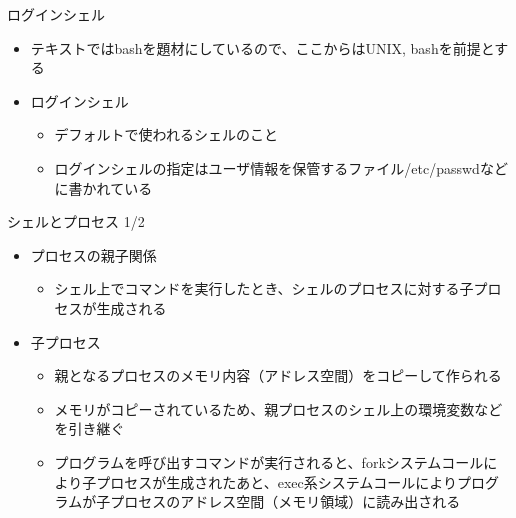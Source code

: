 \documentclass[12pt,aspectratio=169]{beamer}
\begin{document}
\begin{frame}{ログインシェル}
  \begin{itemize}
    \item テキストではbashを題材にしているので、ここからはUNIX, bashを前提とする

    \item ログインシェル
      \begin{itemize}
        \item デフォルトで使われるシェルのこと
        \item ログインシェルの指定はユーザ情報を保管するファイル/etc/passwdなどに書かれている
      \end{itemize}

  \end{itemize}

\end{frame}
\begin{frame}{シェルとプロセス 1/2}
  \begin{itemize}
    \item プロセスの親子関係
      \begin{itemize}
        \item シェル上でコマンドを実行したとき、シェルのプロセスに対する子プロセスが生成される
      \end{itemize}
    \item 子プロセス
      \begin{itemize}
        \item 親となるプロセスのメモリ内容（アドレス空間）をコピーして作られる
        \item メモリがコピーされているため、親プロセスのシェル上の環境変数などを引き継ぐ
        \item プログラムを呼び出すコマンドが実行されると、forkシステムコールにより子プロセスが生成されたあと、exec系システムコールによりプログラムが子プロセスのアドレス空間（メモリ領域）に読み出される
      \end{itemize}

  \end{itemize}

\end{frame}
\end{document}
